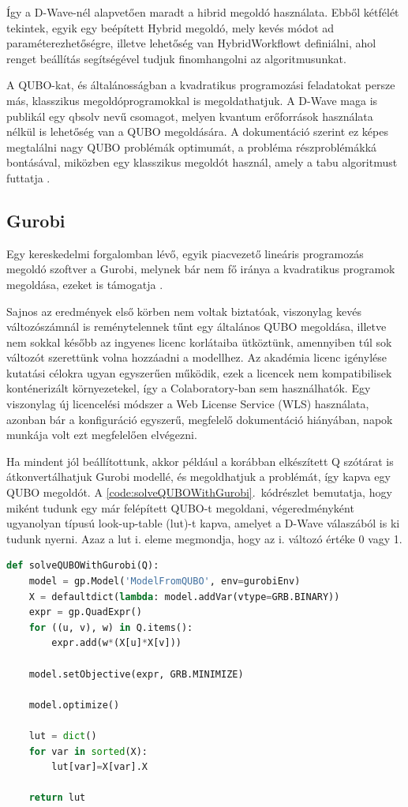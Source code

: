 Így a D-Wave-nél alapvetően maradt a hibrid megoldó használata. Ebből kétfélét tekintek, egyik egy beépített Hybrid megoldó, mely kevés módot ad paraméterezhetőségre, illetve lehetőség van HybridWorkflowt definiálni, ahol renget beállítás segítségével tudjuk finomhangolni az algoritmusunkat.


A QUBO-kat, és általánosságban a kvadratikus programozási feladatokat persze más, klasszikus megoldóprogramokkal is megoldathatjuk. A D-Wave maga is publikál egy qbsolv nevű csomagot, melyen kvantum erőforrások használata nélkül is lehetőség van a QUBO megoldására. A dokumentáció szerint ez képes megtalálni nagy QUBO problémák optimumát, a probléma részproblémákká bontásával, miközben egy klasszikus megoldót használ, amely a tabu algoritmust futtatja \cite{DWaveOceanQbsolv}. 

\subsection{Gurobi}\label{sec:Gurobi}

Egy kereskedelmi forgalomban lévő, egyik piacvezető lineáris programozás megoldó szoftver a Gurobi, melynek bár nem fő iránya a kvadratikus programok megoldása, ezeket is támogatja \cite{gurobi}. 

Sajnos az eredmények első körben nem voltak biztatóak, viszonylag kevés változószámnál is reménytelennek tűnt egy általános QUBO megoldása, illetve nem sokkal később az ingyenes licenc korlátaiba ütköztünk, amennyiben túl sok változót szerettünk volna hozzáadni a modellhez. Az akadémia licenc igénylése kutatási célokra ugyan egyszerűen működik, ezek a licencek nem kompatibilisek konténerizált környezetekel, így a Colaboratory-ban sem használhatók. Egy viszonylag új licencelési módszer a Web License Service (WLS) használata\cite{gurobiWLS}, azonban bár a konfiguráció egyszerű, megfelelő dokumentáció hiányában, napok munkája volt ezt megfelelően elvégezni\cite{gurobiAcademicColab}.

Ha mindent jól beállítottunk, akkor például a korábban elkészített Q szótárat is átkonvertálhatjuk Gurobi modellé, és megoldhatjuk a problémát, így kapva egy QUBO megoldót. A \ref{code:solveQUBOWithGurobi}.~kódrészlet bemutatja, hogy miként tudunk egy már felépített QUBO-t megoldani, végeredményként ugyanolyan típusú look-up-table (lut)-t kapva, amelyet a D-Wave válaszából is ki tudunk nyerni. Azaz a lut i. eleme megmondja, hogy az i. változó értéke 0 vagy 1.

\begin{lstlisting}[language=python,caption=Max-cut QUBO,label=code:solveQUBOWithGurobi]	
def solveQUBOWithGurobi(Q):
	model = gp.Model('ModelFromQUBO', env=gurobiEnv)
	X = defaultdict(lambda: model.addVar(vtype=GRB.BINARY))
	expr = gp.QuadExpr()
	for ((u, v), w) in Q.items():
		expr.add(w*(X[u]*X[v]))
	
	model.setObjective(expr, GRB.MINIMIZE)
	
	model.optimize()
	
	lut = dict()
	for var in sorted(X):
		lut[var]=X[var].X
	
	return lut
	
\end{lstlisting}

